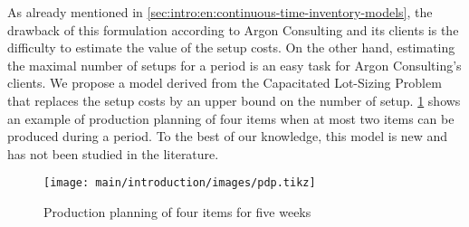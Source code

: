 As already mentioned in \cref{sec:intro:en:continuous-time-inventory-models}, the drawback of this formulation according to Argon Consulting and its clients is the difficulty to estimate the value of the setup costs.
On the other hand, estimating the maximal number of setups for a period is an easy task for Argon Consulting's clients.
We propose a model derived from the Capacitated Lot-Sizing Problem that replaces the setup costs by an upper bound on the number of setup.
\cref{fig:intro:en:pdp} shows an example of production planning of four items when at most two items can be produced during a period.
To the best of our knowledge, this model is new and has not been studied in the literature.

\begin{figure}[!ht]
  \centering
  \texttt{[image: main/introduction/images/pdp.tikz]}
  \caption{Production planning of four items for five weeks}
  \label{fig:intro:en:pdp}
\end{figure}


